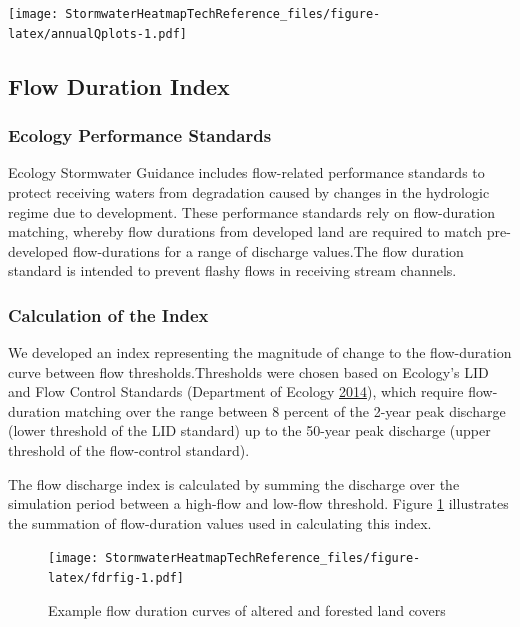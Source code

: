 \documentclass[
]{report}
\begin{document}
\texttt{[image: StormwaterHeatmapTechReference\_files/figure-latex/annualQplots-1.pdf]}

\hypertarget{flow-duration-index}{%
\subsection{Flow Duration Index}\label{flow-duration-index}}

\hypertarget{ecology-performance-standards}{%
\subsubsection{Ecology Performance Standards}\label{ecology-performance-standards}}

Ecology Stormwater Guidance includes flow-related performance standards to protect receiving waters from degradation caused by changes in the hydrologic regime due to development. These performance standards rely on flow-duration matching, whereby flow durations from developed land are required to match pre-developed flow-durations for a range of discharge values.The flow duration standard is intended to prevent flashy flows in receiving stream channels.

\hypertarget{calculation-of-the-index}{%
\subsubsection{Calculation of the Index}\label{calculation-of-the-index}}

We developed an index representing the magnitude of change to the flow-duration curve between flow thresholds.Thresholds were chosen based on Ecology's LID and Flow Control Standards (Department of Ecology \protect\hyperlink{ref-DepartmentofEcology2014}{2014}), which require flow-duration matching over the range between 8 percent of the 2-year peak discharge (lower threshold of the LID standard) up to the 50-year peak discharge (upper threshold of the flow-control standard).

The flow discharge index is calculated by summing the discharge over the simulation period between a high-flow and low-flow threshold. Figure \ref{fig:fdrfig} illustrates the summation of flow-duration values used in calculating this index.

\begin{figure}
\centering
\texttt{[image: StormwaterHeatmapTechReference\_files/figure-latex/fdrfig-1.pdf]}
\caption{\label{fig:fdrfig}Example flow duration curves of altered and forested land covers}
\end{figure}
\end{document}
